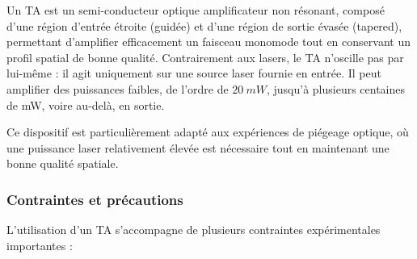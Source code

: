 Un \gls{TA} est un semi-conducteur optique amplificateur non résonant, composé d'une région d'entrée étroite (guidée) et d'une région de sortie évasée (tapered), permettant d'amplifier efficacement un faisceau monomode tout en conservant un profil spatial de bonne qualité. Contrairement aux lasers, le \gls{TA} n'oscille pas par lui-même : il agit uniquement sur une source laser fournie en entrée. Il peut amplifier des puissances faibles, de l'ordre de $20~mW$, jusqu’à plusieurs centaines de mW, voire au-delà, en sortie.


Ce dispositif est particulièrement adapté aux expériences de piégeage optique, où une puissance laser relativement élevée est nécessaire tout en maintenant une bonne qualité spatiale.

\subsubsection*{Contraintes et précautions}

L'utilisation d’un TA s’accompagne de plusieurs contraintes expérimentales importantes :

%    
%    


